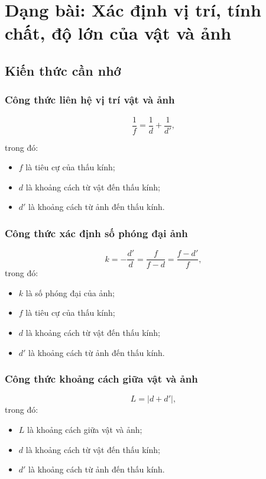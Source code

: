 
\chapter{Dạng bài: Xác định vị trí, tính chất, độ lớn của vật và ảnh }
	
\section{Kiến thức cần nhớ}
	
\subsection{Công thức liên hệ vị trí vật và ảnh}
\begin{equation}\label{eq:A004-2-1}
\dfrac{1}{f}=\dfrac{1}{d}+\dfrac{1}{d'},
\end{equation}

trong đó:
\begin{itemize}
	\item $f$ là tiêu cự của thấu kính;
	\item $d$ là khoảng cách từ vật đến thấu kính;
	\item $d'$ là khoảng cách từ ảnh đến thấu kính. 
\end{itemize}
\subsection{Công thức xác định số phóng đại ảnh}
\begin{equation}\label{eq:A004-2-2}
k=-\dfrac{d'}{d}=\dfrac{f}{f-d}=\dfrac{f-d'}{f},
\end{equation}
trong đó:
\begin{itemize}
	\item $k$ là số phóng đại của ảnh;
	\item $f$ là tiêu cự của thấu kính;
	\item $d$ là khoảng cách từ vật đến thấu kính;
	\item $d'$ là khoảng cách từ ảnh đến thấu kính. 
\end{itemize}

\subsection{Công thức khoảng cách giữa vật và ảnh}
\begin{equation}\label{eq:A004-2-3}
L=\left|d+d' \right| ,
\end{equation}
trong đó:
\begin{itemize}
	\item $L$ là khoảng cách giữa vật và ảnh;
	\item $d$ là khoảng cách từ vật đến thấu kính;
	\item $d'$ là khoảng cách từ ảnh đến thấu kính. 
\end{itemize}
	
